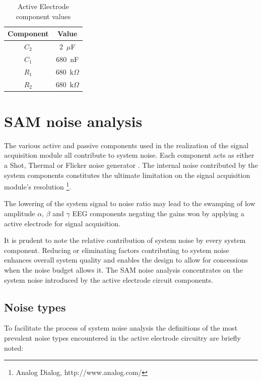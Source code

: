 \begin{table}
\begin{center}	
	\begin{tabular}[htpb]{|c|c|} \hline
	Component & Value  \\ \hline
	$C_2$ & 2~$\mu$F \\
	$C_1$ & 680~nF \\ 
	$R_1$ & 680~k$\Omega$ \\
	$R_2$ & 680~k$\Omega$ \\
	\hline
	\end{tabular}
	\caption{Active Electrode component values}
	\label{table:ae-val}
\end{center}	
\end{table}

\section{SAM noise analysis}
\label{section:noise-analysis}
The various active and passive components used in the realization of
the signal acquisition module all contribute to system noise. Each
component acts as either a Shot, Thermal or Flicker noise generator
\cite[p2]{noise-analysis}. The internal noise contributed by the
system components constitutes the ultimate limitation on the signal
acquisition module's resolution \footnote{Analog Dialog,
http://www.analog.com/}.

The lowering of the system signal to noise ratio may lead to the
swamping of low amplitude $\alpha$, $\beta$ and $\gamma$ EEG
components negating the gains won by applying a active electrode for
signal acquisition.

It is prudent to note the relative contribution of system noise by
every system component. Reducing or eliminating factors contributing
to system noise enhances overall system quality and enables the design
to allow for concessions when the noise budget allows it. The SAM
noise analysis concentrates on the system noise introduced by the
active electrode circuit components.


\subsection{Noise types}
To facilitate the process of system noise analysis the definitions of
the most prevalent noise types encountered in the active electrode
circuitry are briefly noted:

